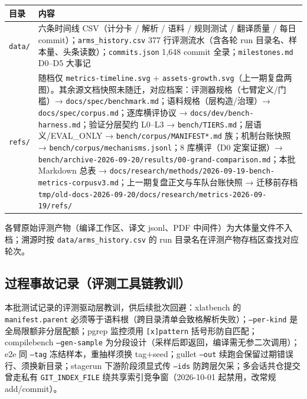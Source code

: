 \begin{center}\small
\begin{tabular}{@{}l>{\raggedright\arraybackslash}p{10.6cm}@{}}
\toprule
目录 & 内容 \\
\midrule
\texttt{data/} & 六条时间线 CSV（计分卡 / 解析 / 语料 / 规则测试 / 翻译质量 / 每日 commit）；\texttt{arms\_history.csv} 377 行评测流水（含各轮 run 目录名、样本量、头条读数）；\texttt{commits.json} 1{,}648 commit 全录；\texttt{milestones.md} D0--D5 大事记 \\
\midrule
\texttt{refs/} & 随档仅 \texttt{metrics-timeline.svg} + \texttt{assets-growth.svg}（上一期复盘两图）。其余源文档快照未随迁，对应档案：评测器规格（七臂定义/门槛）→ \texttt{docs/spec/benchmark.md}；语料规格（层构造/治理）→ \texttt{docs/spec/corpus.md}；逐库横评协议 → \texttt{docs/dev/bench-harness.md}；验证分层契约 L0--L3 → \texttt{bench/TIERS.md}；层语义/EVAL\_ONLY → \texttt{bench/corpus/MANIFEST*.md} 族；机制台账快照 → \texttt{bench/corpus/mechanisms.jsonl}；8 库横评（D0 定案证据）→ \texttt{bench/archive-2026-09-20/results/00-grand-comparison.md}；本批 Markdown 总表 → \texttt{docs/research/methods/2026-09-19-bench-metrics-corpusv3.md}；上一期复盘正文与车队台账快照 → 迁移前存档 \texttt{tmp/old-docs-2026-09-20/docs/research/metrics-2026-09-19/refs/} \\
\bottomrule
\end{tabular}
\end{center}

各臂原始评测产物（编译工作区、译文 jsonl、PDF 中间件）为大体量文件不入档；溯源时按 \texttt{data/arms\_history.csv} 的 run 目录名在评测产物存档区查找对应轮次。

\subsection{过程事故记录（评测工具链教训）}

本批测试记录的评测驱动层教训，供后续批次回避：xlatbench 的 \texttt{manifest.parent} 必须等于语料根（跨目录清单会致格解析失败）；\texttt{--per-kind} 是全局限额非分层配额；pgrep 监控须用 \texttt{[x]pattern} 括号形防自匹配；compilebench \texttt{--gen-sample} 为分段设计（采样后即返回，编译需无参二次调用）；e2e 同 \texttt{--tag} 冻结样本，重抽样须换 tag+seed；gullet \texttt{--out} 续跑会保留过期错误行、须换新目录；stagerun 下游阶段须显式传 \texttt{--ids} 防跨层欠采；多会话共仓提交曾走私有 \texttt{GIT\_INDEX\_FILE} 绕共享索引竞争窗（2026-10-01 起禁用，改常规 add/commit）。
